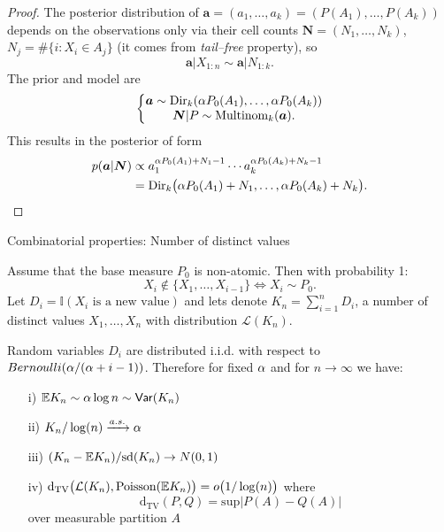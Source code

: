 \begin{proof}
The posterior distribution of $\boldsymbol{a} = (a_1, \ldots, a_k) = ( P(A_1), \ldots, P(A_k) )$ depends on the observations only via their cell counts $\boldsymbol{N}= (N_1, \ldots, N_k)$, $N_j = \# \{ i : X_i \in A_j\}$  (it comes from \textit{tail--free} property), so
\begin{equation*}
  \boldsymbol{a} \vert X_{1:n}\sim \boldsymbol{a} \vert N_{1:k}.
\end{equation*}
The prior  and model are
\begin{equation*}
    \left \{ 
    \begin{matrix}
\boldsymbol{a} \sim \text{Dir}_k (\alpha P_0(A_1), \ldots, \alpha P_0(A_k))
\\
\boldsymbol{N}\vert P \sim {\rm Multinom}_k (\boldsymbol{a}).
\end{matrix}\right.
\end{equation*}
This results in the posterior of form 
\begin{align*}
    p(\boldsymbol{a}\vert \boldsymbol{N}) 
    &\propto a_1^{\alpha P_0(A_1) +N_1-1}\cdots a_k^{\alpha P_0(A_k)+N_k -1}\\ 
    &= \text{Dir}_k\big( \alpha P_0(A_1) +N_1, \ldots, \alpha P_0(A_k) +N_k\big).
\end{align*} \end{proof}



{Combinatorial properties: Number of distinct values}

Assume that the base measure $P_0$ is non-atomic. Then  with probability 1:
$$
X_i\notin\{X_1,\ldots, X_{i-1}\} \Leftrightarrow X_i \sim P_0.
$$
Let $D_i =  \mathbb{I}(X_i \text{ is a new value})$ and lets denote $K_n=\sum_{i=1}^nD_i$, a number of distinct values $X_1,\ldots, X_n$ with distribution $\mathcal{L}(K_n)$.
\begin{proposition}
Random variables $D_i$ are distributed i.i.d. with respect to $Bernoulli(\alpha/(\alpha + i - 1))$. Therefore for fixed $\alpha$ and for $n\rightarrow \infty$ we have:
\begin{enumerate}
    \item[i)] $\mathbb{E} K_n\sim \alpha \log n \sim \mathsf{Var}(K_n)$
    \item[ii)] $K_n/\log(n)\xrightarrow{a.s.} \alpha$
    \item[iii)] $(K_n - \mathbb{E} K_n)/\text{sd}(K_n)\rightarrow N(0,1) $
    \item[iv)] $\text{d}_{\text{TV}}\big( \mathcal{L}(K_n), \text{Poisson}(\mathbb{E} K_n) \big)=o \big(1 / \log(n)\big)$ where $$
    \text{d}_{\text{TV}}(P,Q)=\text{sup}|P(A)-Q(A)|
    $$
    over measurable  partition $A$
\end{enumerate}
\end{proposition}



